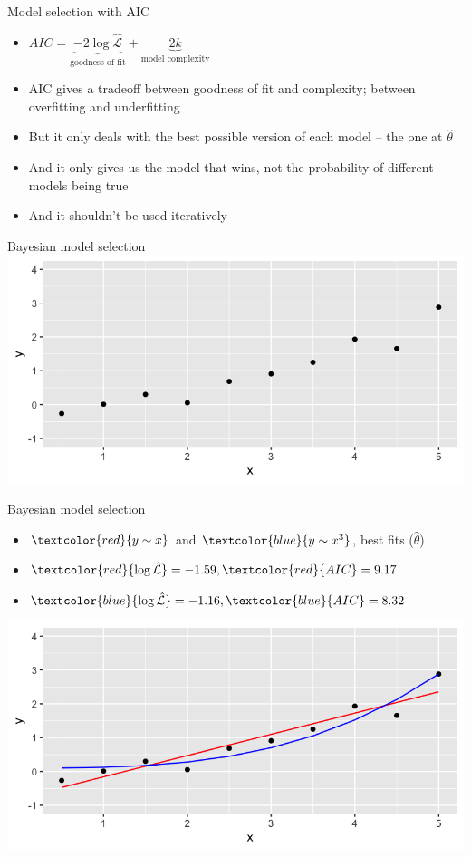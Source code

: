 \documentclass[10pt]{beamer}
\begin{document}
\begin{frame}{Model selection with AIC}
  \begin{itemize}
        \item $AIC = \underbrace{-2 \log \hat{\mathcal{L}}}_{\text{goodness of fit}} + \underbrace{2k}_{\text{model complexity}}$
        \item AIC gives a tradeoff between goodness of fit and complexity; between overfitting and underfitting
        \item But it only deals with the best possible version of each model -- the one at $\hat{\theta}$
        \item And it only gives us the model that wins, not the probability of different models being true
          \item And it shouldn't be used iteratively 
  \end{itemize}
\end{frame}

\begin{frame}{Bayesian model selection}  
 \includegraphics[width=\textwidth]{cedas-bayes-mod-1.png}
\end{frame}
\begin{frame}{Bayesian model selection}
  \begin{itemize}
    \item  $\textcolor{red}{y \sim x}$ and $\textcolor{blue}{y \sim x^3}$, best fits ($\hat{\theta}$)
    \item $\textcolor{red}{\log \hat{\mathcal{L}}} = -1.59, \textcolor{red}{AIC} = 9.17$
      \item $\textcolor{blue}{\log \hat{\mathcal{L}}} = -1.16, \textcolor{blue}{AIC} = 8.32$
      \end{itemize}
 \includegraphics[width=\textwidth]{cedas-bayes-mod-2.png}
\end{frame}
\end{document}
